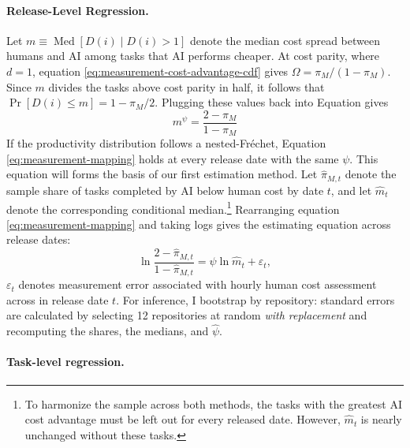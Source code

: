 \documentclass[11pt]{article}
\begin{document}
\paragraph{Release-Level Regression.}

Let $m\equiv\operatorname{Med}[D(i)\mid D(i)>1]$ denote the median
cost spread between humans and AI among tasks that AI performs cheaper.
At cost parity, where $d=1$, equation \eqref{eq:measurement-cost-advantage-cdf}
gives $\Omega=\pi_{M}/(1-\pi_{M})$. Since $m$ divides the tasks
above cost parity in half, it follows that $\Pr[D(i)\leq m]=1-\pi_{M}/2$.
Plugging these values back into Equation gives
\begin{equation}
m^{\psi}=\frac{2-\pi_{M}}{1-\pi_{M}}\label{eq:measurement-mapping}
\end{equation}
If the productivity distribution follows a nested-Fréchet, Equation
\eqref{eq:measurement-mapping} holds at every release date with the
same $\psi$. This equation will forms the basis of our first estimation
method. Let $\widehat{\pi}_{M,t}$ denote the sample share of tasks
completed by AI below human cost by date $t$, and let $\widehat{m}_{t}$
denote the corresponding conditional median.\footnote{To harmonize the sample across both methods, the tasks with the greatest
AI cost advantage must be left out for every released date. However,
$\widehat{m}_{t}$ is nearly unchanged without these tasks.} Rearranging equation \eqref{eq:measurement-mapping} and taking logs
gives the estimating equation across release dates:
\begin{equation}
\ln\frac{2-\widehat{\pi}_{M,t}}{1-\widehat{\pi}_{M,t}}=\psi\ln\widehat{m}_{t}+\varepsilon_{t},\label{eq:sm-regression}
\end{equation}
$\varepsilon_{t}$ denotes measurement error associated with hourly
human cost assessment across in release date $t$. For inference,
I bootstrap by repository: standard errors are calculated by selecting
12 repositories at random \emph{with replacement}
and recomputing the shares, the medians, and $\widehat{\psi}$.

\paragraph{Task-level regression.}
\end{document}

